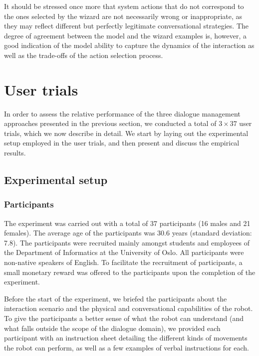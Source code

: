 It should be stressed once more that system actions that do not correspond to the ones selected by the wizard are not necessarily wrong or inappropriate, as they may reflect different but perfectly legitimate conversational strategies. The degree of agreement between the model and the wizard examples is, however, a good indication of the model ability to capture the dynamics of the interaction as well as the trade-offs of the action selection process. 

\section{User trials}

In order to assess the relative performance of the three dialogue management approaches presented in the previous section, we conducted a total of $3 \times 37$ user trials, which we now describe in detail. We start by laying out the experimental setup employed in the user trials, and then present and discuss the empirical results. 

\subsection{Experimental setup}

\subsubsection*{Participants}

The experiment was carried out with a total of 37 participants (16 males and 21 females).  The average age of the participants was 30.6 years (standard deviation: 7.8). The participants were recruited mainly amongst students and employees of the Department of Informatics at the University of Oslo. All participants were non-native speakers of English. To facilitate the recruitment of participants, a small monetary reward was offered to the participants upon the completion of the experiment. 

Before the start of the experiment, we briefed the participants about the interaction scenario and the physical and conversational capabilities of the robot. To give the participants a better sense of what the robot can understand (and what falls outside the scope of the dialogue domain), we provided each participant with an instruction sheet detailing the different kinds of movements the robot can perform, as well as a few examples of verbal instructions for each.

